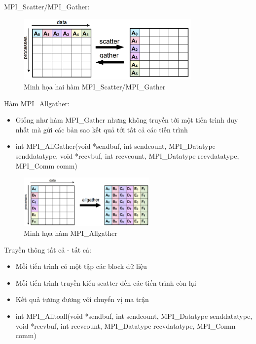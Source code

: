 \documentclass[14pt, a4paper]{article}
\numberwithin{equation}{section}
\numberwithin{figure}{section}
\numberwithin{dl}{section}
\numberwithin{md}{section}
\numberwithin{bd}{section}
\numberwithin{dn}{section}
\numberwithin{hq}{section}
\begin{document}
MPI\_Scatter/MPI\_Gather:

\begin{figure}[H]
    \centering
    \includegraphics[width=0.8\textwidth]{figures/MPI/Scatter_Gather.png}
    \caption{Minh họa hai hàm MPI\_Scatter/MPI\_Gather}
\end{figure}

Hàm MPI\_Allgather:

\begin{itemize}
    \item Giống như hàm MPI\_Gather nhưng không truyền tới một tiến trình duy nhất mà gửi các bản sao kết quả tới tất cả các tiến trình
    \item int MPI\_AllGather(void *sendbuf, int sendcount,
                            MPI\_Datatype senddatatype, void *recvbuf,
                            int recvcount, MPI\_Datatype recvdatatype,
                            MPI\_Comm comm)
\end{itemize}
\begin{figure}[H]
    \centering
    \includegraphics[width=0.6\textwidth]{figures/MPI/Allgather.png}
    \caption{Minh họa hàm MPI\_Allgather}
\end{figure}


Truyền thông tất cả - tất cả:

\begin{itemize}
    \item Mỗi tiến trình có một tập các block dữ liệu
    \item Mỗi tiến trình truyền kiểu scatter đến các tiến trình còn lại
    \item Kết quả tương đương với chuyển vị ma trận
    \item int MPI\_Alltoall(void *sendbuf, int sendcount,
                            MPI\_Datatype senddatatype, void *recvbuf,
                            int recvcount, MPI\_Datatype recvdatatype,
                            MPI\_Comm comm) 
\end{itemize}
\end{document}
